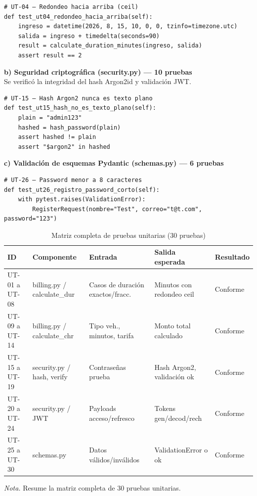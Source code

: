 \begin{verbatim}
# UT-04 — Redondeo hacia arriba (ceil)
def test_ut04_redondeo_hacia_arriba(self):
    ingreso = datetime(2026, 8, 15, 10, 0, 0, tzinfo=timezone.utc)
    salida = ingreso + timedelta(seconds=90)
    result = calculate_duration_minutes(ingreso, salida)
    assert result == 2
\end{verbatim}

\textbf{b) Seguridad criptográfica (security.py) — 10 pruebas}\\
Se verificó la integridad del hash Argon2id y validación JWT.

\begin{verbatim}
# UT-15 — Hash Argon2 nunca es texto plano
def test_ut15_hash_no_es_texto_plano(self):
    plain = "admin123"
    hashed = hash_password(plain)
    assert hashed != plain
    assert "$argon2" in hashed
\end{verbatim}

\textbf{c) Validación de esquemas Pydantic (schemas.py) — 6 pruebas}
\begin{verbatim}
# UT-26 — Password menor a 8 caracteres
def test_ut26_registro_password_corto(self):
    with pytest.raises(ValidationError):
        RegisterRequest(nombre="Test", correo="t@t.com", password="123")
\end{verbatim}

\begin{table}[htbp]
\caption{Matriz completa de pruebas unitarias (30 pruebas)}
\label{tab:matriz_ut}
\begin{tabular}{@{}p{2.5cm} p{3.5cm} p{4cm} p{3.5cm} p{2cm}@{}}
\toprule
\textbf{ID} & \textbf{Componente} & \textbf{Entrada} & \textbf{Salida esperada} & \textbf{Resultado} \\
\midrule
UT-01 a UT-08 & billing.py / calculate\_dur & Casos de duración exactos/fracc. & Minutos con redondeo ceil & Conforme \\
UT-09 a UT-14 & billing.py / calculate\_chr & Tipo veh., minutos, tarifa & Monto total calculado & Conforme \\
UT-15 a UT-19 & security.py / hash, verify & Contraseñas prueba & Hash Argon2, validación ok & Conforme \\
UT-20 a UT-24 & security.py / JWT & Payloads acceso/refresco & Tokens gen/decod/rech & Conforme \\
UT-25 a UT-30 & schemas.py & Datos válidos/inválidos & ValidationError o ok & Conforme \\
\bottomrule
\end{tabular}
\par\vspace{0.2cm}
\textit{Nota.} Resume la matriz completa de 30 pruebas unitarias.
\end{table}

